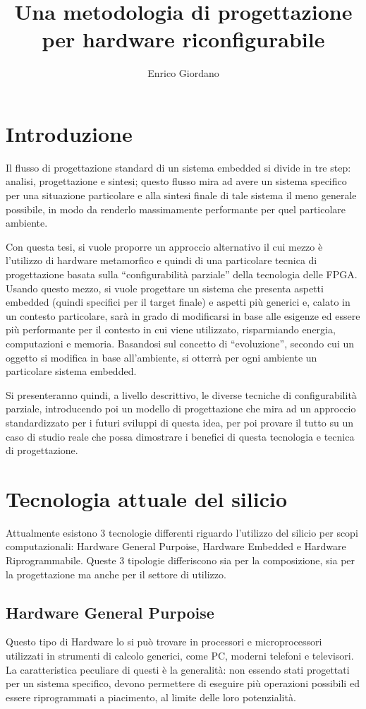 \documentclass[11pt]{article} %
\title{Una metodologia di progettazione per hardware riconfigurabile}
\author{Enrico Giordano}
\date{} %
\begin{document}
\maketitle

\section{Introduzione}

Il flusso di progettazione standard di un sistema embedded si divide in tre step: analisi, progettazione e sintesi; questo flusso mira ad avere un sistema specifico per una situazione particolare e alla sintesi finale di tale sistema il meno generale possibile, in modo da renderlo massimamente performante per quel particolare ambiente.

Con questa tesi, si vuole proporre un approccio alternativo il cui mezzo è l'utilizzo di hardware metamorfico e quindi di una particolare tecnica di progettazione basata sulla ``configurabilità parziale'' della tecnologia delle FPGA. Usando questo mezzo, si vuole progettare un sistema che presenta aspetti embedded (quindi specifici per il target finale) e aspetti più generici e, calato in un contesto particolare, sarà in grado di modificarsi in base alle esigenze ed essere più performante per il contesto in cui viene utilizzato, risparmiando energia, computazioni e memoria. Basandosi sul concetto di ``evoluzione'', secondo cui un oggetto si modifica in base all'ambiente, si otterrà per ogni ambiente un particolare sistema embedded.

Si presenteranno quindi, a livello descrittivo, le diverse tecniche di configurabilità parziale, introducendo poi un modello di progettazione che mira ad un approccio standardizzato per i futuri sviluppi di questa idea, per poi provare il tutto su un caso di studio reale che possa dimostrare i benefici di questa tecnologia e tecnica di progettazione.

\section{Tecnologia attuale del silicio}
Attualmente esistono 3 tecnologie differenti riguardo l'utilizzo del silicio per scopi computazionali: Hardware General Purpoise, Hardware Embedded e Hardware Riprogrammabile. Queste 3 tipologie differiscono sia per la composizione, sia per la progettazione ma anche per il settore di utilizzo.

\subsection{Hardware General Purpoise}
Questo tipo di Hardware lo si può trovare in processori e microprocessori utilizzati in strumenti di calcolo generici, come PC, moderni telefoni e televisori. La caratteristica peculiare di questi è la generalità: non essendo stati progettati per un sistema specifico, devono permettere di eseguire più operazioni possibili ed essere riprogrammati a piacimento, al limite delle loro potenzialità.
\end{document}

